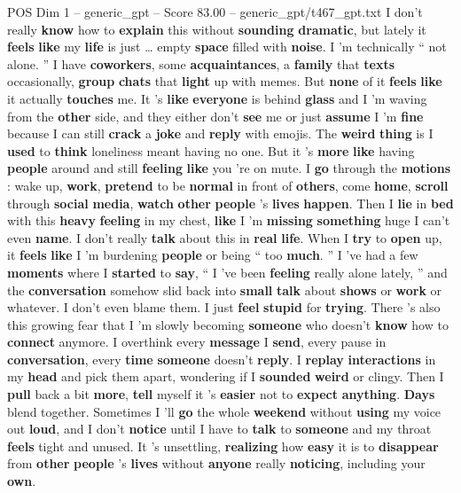 \begin{textsample}{POS Dim 1 – generic\_gpt – Score 83.00 – generic\_gpt/t467\_gpt.txt}  \label{ex:f1_pos_004}
I don't really \textbf{know} how to \textbf{explain} this without \textbf{sounding} \textbf{dramatic}, but lately it \textbf{feels} \textbf{like} my \textbf{life} is just … empty \textbf{space} filled with \textbf{noise}.
I ’m technically “ not alone. ” I have \textbf{coworkers}, some \textbf{acquaintances}, a \textbf{family} that \textbf{texts} occasionally, \textbf{group} \textbf{chats} that \textbf{light} up with memes.
But \textbf{none} of it \textbf{feels} \textbf{like} it actually \textbf{touches} me.
It ’s \textbf{like} \textbf{everyone} is behind \textbf{glass} and I ’m waving from the \textbf{other} side, and they either don't \textbf{see} me or just \textbf{assume} I ’m \textbf{fine} because I can still \textbf{crack} a \textbf{joke} and \textbf{reply} with emojis.
The \textbf{weird} \textbf{thing} is I \textbf{used} to \textbf{think} loneliness meant having no one.
But it ’s \textbf{more} \textbf{like} having \textbf{people} around and still \textbf{feeling} \textbf{like} you ’re on mute.
I \textbf{go} through the \textbf{motions} : wake up, \textbf{work}, \textbf{pretend} to be \textbf{normal} in front of \textbf{others}, come \textbf{home}, \textbf{scroll} through \textbf{social} \textbf{media}, \textbf{watch} \textbf{other} \textbf{people} ’s \textbf{lives} \textbf{happen}.
Then I \textbf{lie} in \textbf{bed} with this \textbf{heavy} \textbf{feeling} in my chest, \textbf{like} I ’m \textbf{missing} \textbf{something} huge I can't even \textbf{name}.
I don't really \textbf{talk} about this in \textbf{real} \textbf{life}.
When I \textbf{try} to \textbf{open} up, it \textbf{feels} \textbf{like} I ’m burdening \textbf{people} or being “ too \textbf{much}. ” I ’ve had a few \textbf{moments} where I \textbf{started} to \textbf{say}, “ I ’ve been \textbf{feeling} really alone lately, ” and the \textbf{conversation} somehow slid back into \textbf{small} \textbf{talk} about \textbf{shows} or \textbf{work} or whatever.
I don't even blame them.
I just \textbf{feel} \textbf{stupid} for \textbf{trying}.
There ’s also this growing fear that I ’m slowly becoming \textbf{someone} who doesn't \textbf{know} how to \textbf{connect} anymore.
I overthink every \textbf{message} I \textbf{send}, every pause in \textbf{conversation}, every \textbf{time} \textbf{someone} doesn't \textbf{reply}.
I \textbf{replay} \textbf{interactions} in my \textbf{head} and pick them apart, wondering if I \textbf{sounded} \textbf{weird} or clingy.
Then I \textbf{pull} back a bit \textbf{more}, \textbf{tell} myself it ’s \textbf{easier} not to \textbf{expect} \textbf{anything}. \textbf{Days} blend together.
Sometimes I ’ll \textbf{go} the whole \textbf{weekend} without \textbf{using} my voice out \textbf{loud}, and I don't \textbf{notice} until I have to \textbf{talk} to \textbf{someone} and my throat \textbf{feels} tight and unused.
It ’s unsettling, \textbf{realizing} how \textbf{easy} it is to \textbf{disappear} from \textbf{other} \textbf{people} ’s \textbf{lives} without \textbf{anyone} really \textbf{noticing}, including your \textbf{own}.


\end{textsample}
